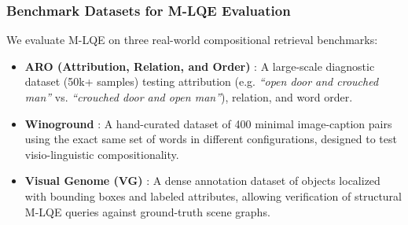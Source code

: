 \documentclass[11pt,a4paper]{article}
\begin{document}
\subsubsection{Benchmark Datasets for M-LQE Evaluation}
We evaluate M-LQE on three real-world compositional retrieval benchmarks:
\begin{itemize}
    \item \textbf{ARO (Attribution, Relation, and Order)} \cite{yuksekgonul2022and}: A large-scale diagnostic dataset (50k+ samples) testing attribution (e.g. \textit{``open door and crouched man''} vs. \textit{``crouched door and open man''}), relation, and word order.
    \item \textbf{Winoground} \cite{thrush2022winoground}: A hand-curated dataset of 400 minimal image-caption pairs using the exact same set of words in different configurations, designed to test visio-linguistic compositionality.
    \item \textbf{Visual Genome (VG)} \cite{krishna2017visual}: A dense annotation dataset of objects localized with bounding boxes and labeled attributes, allowing verification of structural M-LQE queries against ground-truth scene graphs.
\end{itemize}
\end{document}
